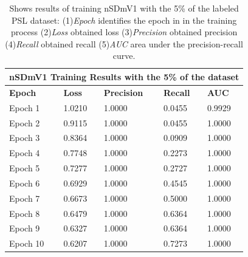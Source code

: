 \documentclass[twocolumn,conference]{article}
\begin{document}
\begin{table}[!htb]
\captionsetup{font=footnotesize}
\centering
\begin{tabular}{ p{2.8cm} p{2.8cm} p{2.8cm} p{2.8cm} p{2.8cm} }
\toprule
\multicolumn{5}{c}{\textbf{nSDmV1 Training Results with the 5\% of the dataset}} \\
\hline
\hline
\textbf{Epoch}&	\textbf{Loss}	&\textbf{Precision}	&\textbf{Recall}	&\textbf{AUC} \\
\hline
\midrule
Epoch 1&	1.0210&	1.0000&	0.0455&	0.9929\\
Epoch 2&	0.9115&	1.0000&	0.0455&	1.0000\\
Epoch 3&	0.8364&	1.0000&	0.0909&	1.0000\\
Epoch 4&	0.7748&	1.0000&	0.2273&	1.0000\\
Epoch 5&	0.7277&	1.0000&	0.2727&	1.0000\\
Epoch 6&	0.6929&	1.0000&	0.4545&	1.0000\\
Epoch 7&	0.6673&	1.0000&	0.5000&	1.0000\\
Epoch 8&	0.6479&	1.0000&	0.6364&	1.0000\\
Epoch 9&	0.6327&	1.0000&	0.6364&	1.0000\\
Epoch 10&	0.6207&	1.0000&	0.7273&	1.0000\\
\bottomrule
\end{tabular}
\caption{Shows results of training nSDmV1 with the 5\% of the labeled PSL dataset: (1)\textit{Epoch} identifies the epoch in in the training process (2)\textit{Loss} obtained loss (3)\textit{Precision} obtained precision (4)\textit{Recall} obtained recall (5)\textit{AUC} area under the precision-recall curve.}
\label{tab:nSDmV1-detection-results-5-percent}
\end{table}
\end{document}
